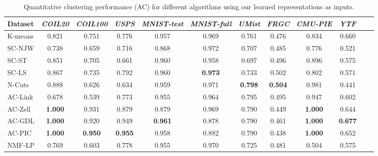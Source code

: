 \documentclass[10pt,twocolumn,letterpaper]{article}
\begin{document}
\begin{table*}[!ht]
\caption{{Quantitative clustering performance (AC) for different algorithms using our learned representations as inputs.}}
\vspace{-5pt}
\center
\small
\begin{tabular}{@{}lccccccccccc}
  \toprule
   Dataset & \textit{COIL20} & \textit{COIL100} & \textit{USPS} & \textit{MNIST-test} & \textit{MNIST-full} & \textit{UMist} & \textit{FRGC} & \textit{CMU-PIE} & \textit{YTF} \\   
  \midrule
  K-means \cite{macqueen1967some}  &0.821 &0.751 &0.776 &0.957 &0.969 &0.761 &0.476 &0.834 &0.660 \\
  
  SC-NJW \cite{ng2002spectral}     &0.738 &0.659 &0.716 &0.868 &0.972 &0.707 &0.485 &0.776 &0.521 \\
      
  SC-ST \cite{zelnik2004self}      &0.851 &0.705 &0.661 &0.960 &0.958 &0.697 &0.496 &0.896 &0.575 \\   
  
  SC-LS \cite{chen2011large}    &0.867 &0.735 &0.792 &0.960 &\textbf{0.973} &0.733 &0.502 & 0.802 &0.571 \\
  
  N-Cuts \cite{shi2000normalized}  &0.888 &0.626 &0.634 &0.959 &0.971 &\textbf{0.798} &\textbf{0.504} &0.981 &0.441   \\
  
  AC-Link \cite{jain1999data}      &0.678 &0.539 &0.773 &0.955 &0.964 &0.795 &0.495 &0.947 &0.602 \\
    
  AC-Zell \cite{zhao2009cyclizing} &\textbf{1.000} &0.931 &0.879 &0.879 &0.969 &0.790 &0.449 &\textbf{1.000} &0.644  \\
  
  AC-GDL \cite{zhang2012graph}     &\textbf{1.000} &0.920 &0.949 &\textbf{0.961} &0.878 & 0.790 &0.461 &\textbf{1.000} &\textbf{0.677}  \\   
  
  AC-PIC \cite{zhang2013agglomerative}&\textbf{1.000} &\textbf{0.950} &\textbf{0.955} &0.958 &0.882 &0.790 &0.438  &\textbf{1.000} &0.652 \\
  
  NMF-LP \cite{cai2009locality}    &0.769 &0.603 &0.778 &{0.955} &0.970 & 0.725 & 0.481 &0.504 &0.575 \\
  \bottomrule
\end{tabular}
\label{TB_Quantitative_Results_withRep_AC}
\end{table*}
\end{document}
